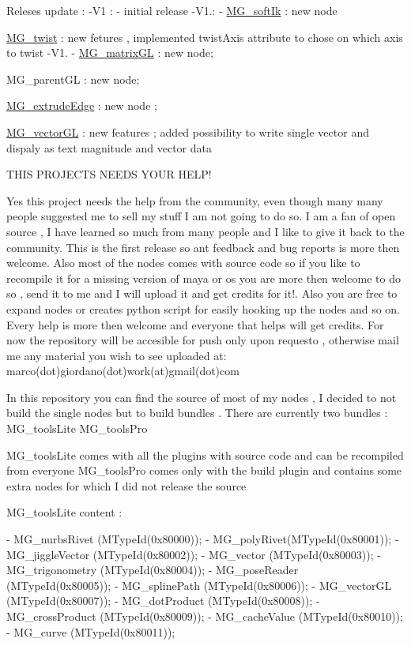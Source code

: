 Releses update \-: -\/\-V1 \-: -\/ initial release -\/\-V1.\-: -\/ \hyperlink{class_m_g__soft_ik}{M\-G\-\_\-soft\-Ik} \-: new node
\begin{DoxyItemize}
\item \hyperlink{class_m_g__twist}{M\-G\-\_\-twist} \-: new fetures , implemented twist\-Axis attribute to chose on which axis to twist -\/\-V1. -\/ \hyperlink{class_m_g__matrix_g_l}{M\-G\-\_\-matrix\-G\-L} \-: new node;
\item M\-G\-\_\-parent\-G\-L \-: new node;
\item \hyperlink{class_m_g__extrude_edge}{M\-G\-\_\-extrude\-Edge} \-: new node ;
\item \hyperlink{class_m_g__vector_g_l}{M\-G\-\_\-vector\-G\-L} \-: new features ; added possibility to write single vector and dispaly as text magnitude and vector data
\end{DoxyItemize}

T\-H\-I\-S P\-R\-O\-J\-E\-C\-T\-S N\-E\-E\-D\-S Y\-O\-U\-R H\-E\-L\-P!

Yes this project needs the help from the community, even though many many people suggested me to sell my stuff I am not going to do so. I am a fan of open source , I have learned so much from many people and I like to give it back to the community. This is the first release so ant feedback and bug reports is more then welcome. Also most of the nodes comes with source code so if you like to recompile it for a missing version of maya or os you are more then welcome to do so , send it to me and I will upload it and get credits for it!. Also you are free to expand nodes or creates python script for easily hooking up the nodes and so on. Every help is more then welcome and everyone that helps will get credits. For now the repository will be accesible for push only upon requesto , otherwise mail me any material you wish to see uploaded at\-: marco(dot)giordano(dot)work(at)gmail(dot)com

In this repository you can find the source of most of my nodes , I decided to not build the single nodes but to build bundles . There are currently two bundles \-: M\-G\-\_\-tools\-Lite M\-G\-\_\-tools\-Pro

M\-G\-\_\-tools\-Lite comes with all the plugins with source code and can be recompiled from everyone M\-G\-\_\-tools\-Pro comes only with the build plugin and contains some extra nodes for which I did not release the source

M\-G\-\_\-tools\-Lite content \-: \begin{DoxyVerb}- MG_nurbsRivet (MTypeId(0x80000));
- MG_polyRivet(MTypeId(0x80001)); 
- MG_jiggleVector  (MTypeId(0x80002));
- MG_vector  (MTypeId(0x80003));
- MG_trigonometry  (MTypeId(0x80004));
- MG_poseReader  (MTypeId(0x80005)); 
- MG_splinePath  (MTypeId(0x80006)); 
- MG_vectorGL (MTypeId(0x80007)); 
- MG_dotProduct  (MTypeId(0x80008)); 
- MG_crossProduct  (MTypeId(0x80009)); 
- MG_cacheValue  (MTypeId(0x80010)); 
- MG_curve  (MTypeId(0x80011));
\end{DoxyVerb}


